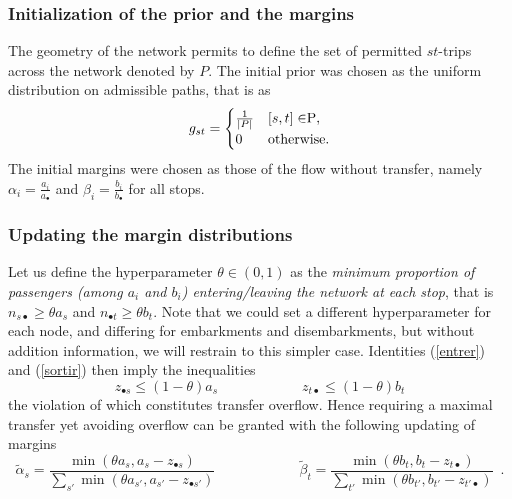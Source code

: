 \documentclass{bmcart}
\begin{document}
\subsubsection{Initialization of the prior and the margins}
The geometry of the network permits to define the set of permitted $st$-trips across the network denoted by $P$. The initial prior was chosen as the uniform distribution on admissible paths, that is as
\begin{equation*}
g_{st} = \begin{cases}
  \frac{1}{\vert P \vert}    & [s, t] \in $P$, \\
  0    & \text{otherwise}.
\end{cases}
\end{equation*}
The initial margins were chosen as  those of the flow without transfer, namely $\alpha_i=\frac{a_i}{a_{\bullet}}$ and $\beta_i=\frac{b_i}{b_\bullet}$ for all stops. 



\subsubsection{Updating  the margin distributions}
\label{marginup}
Let us define the hyperparameter $ \theta\in (0, 1)$ as the \emph{minimum proportion of passengers (among $a_i$ and $b_i$) entering/leaving the network at each stop}, that is $n_{s\bullet}\ge \theta a_s$ and $n_{\bullet t}\ge \theta b_t$. Note that we could set a different hyperparameter for each node, and differing for embarkments and disembarkments, but without addition information, we will restrain to this simpler case. Identities (\ref{entrer}) and  (\ref{sortir}) then imply the inequalities
\begin{displaymath}
z_{\bullet s} \le (1 - \theta) a_s\qquad\qquad \qquad z_{t \bullet} \le  (1 - \theta) b_t
\end{displaymath}
the violation of which constitutes transfer overflow. Hence requiring a maximal transfer yet avoiding overflow can be granted with the following updating of margins
\begin{equation}
\label{alpha_beta_update}
\widetilde{\alpha}_s = \frac{\min(\theta a_s, a_s - z_{\bullet s})}{\sum_{s'} \min(\theta a_{s'}, a_{s'} - z_{\bullet {s'}})}   \qquad \qquad \qquad
	\widetilde{\beta}_t = \frac{\min(\theta b_t, b_t - z_{t \bullet})}{\sum_{t'} \min(\theta b_{t'}, b_{t'} - z_{{t'} \bullet})}  \enspace. 
\end{equation}
 
\end{document}
